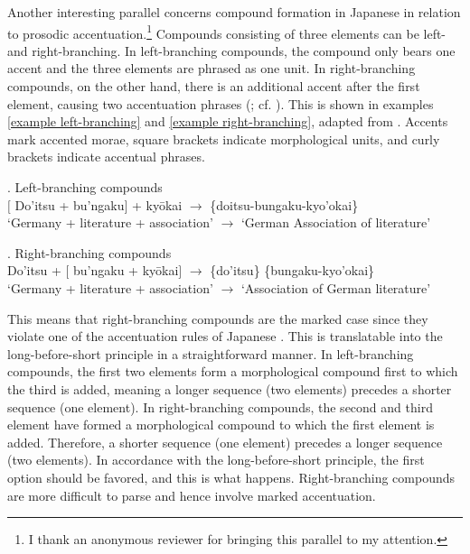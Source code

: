 Another interesting parallel concerns compound formation in Japanese in relation to prosodic accentuation.\footnote{I thank an anonymous reviewer for bringing this parallel to my attention.} Compounds consisting of three elements can be left- and right-branching. In left-branching compounds, the compound only bears one accent and the three elements are phrased as one unit. In right-branching compounds, on the other hand, there is an additional accent after the first element, causing two accentuation phrases (\citealt[12–14]{kubozono:2005:rendaku}; cf. \citealt{nishiyama:2017:phrasal}). This is shown in examples \ref{example left-branching} and \ref{example right-branching}, adapted from \citet[12–14]{kubozono:2005:rendaku}. Accents mark accented morae, square brackets indicate morphological units, and curly brackets indicate accentual phrases.

\ex. Left-branching compounds \\\label{example left-branching}
$\lbrack$ Do’itsu + bu'ngaku$\rbrack$ + kyōkai $\rightarrow$ \{doitsu-bungaku-kyo'okai\}  \\
`Germany + literature + association' $\rightarrow$ `German Association of literature'

\newpage
\ex. Right-branching compounds \\\label{example right-branching}
Do’itsu + $\lbrack$ bu'ngaku + kyōkai$\rbrack$ $\rightarrow$ \{do'itsu\} \{bungaku-kyo'okai\}  \\
`Germany + literature + association' $\rightarrow$ `Association of German literature'

This means that right-branching compounds are the marked case since they violate one of the accentuation rules of Japanese \citep[153]{nishiyama:2017:phrasal}. This is translatable into the long-before-short principle in a straightforward manner. In left-branching compounds, the first two elements form a morphological compound first to which the third is added, meaning a longer sequence (two elements) precedes a shorter sequence (one element). In right-branching compounds, the second and third element have formed a morphological compound to which the first element is added. Therefore, a shorter sequence (one element) precedes a longer sequence (two elements). In accordance with the long-before-short principle, the first option should be favored, and this is what happens. Right-branching compounds are more difficult to parse and hence involve marked accentuation. 

